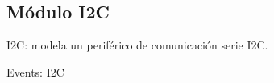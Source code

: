 \subsection{Módulo I2C}

I2C: modela un periférico de comunicación serie I2C.

Events:
I2C


%
%
%
%
%
